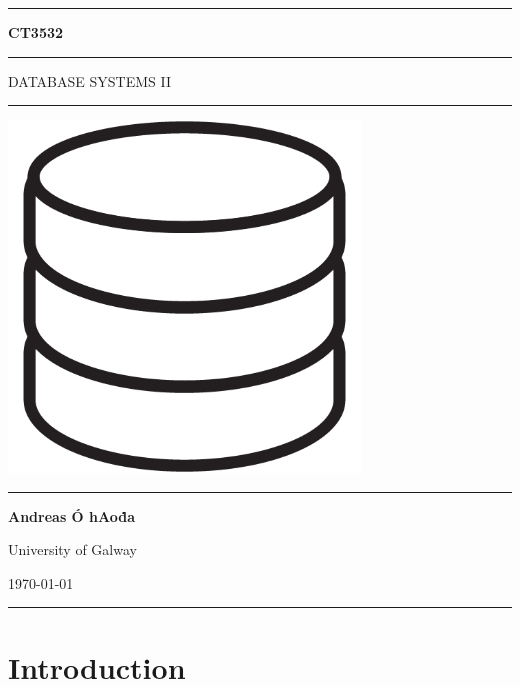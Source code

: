 \documentclass[a4paper,11pt]{article}
\begin{document}
\begin{titlepage}
    \begin{center}
        \hrule
        \vspace*{0.6cm}
        \huge \textbf{CT3532}
        \vspace*{0.6cm}
        \hrule
        \LARGE
       \vspace{0.5cm}
        DATABASE SYSTEMS II
       \vspace{0.5cm}
       \hrule
            
       \vfill
       \includegraphics[width=0.7\textwidth]{images/db.png}
        \vfill

        \Large
       \vspace{0.5cm}
       \hrule
       \vspace{0.5cm}
       \textbf{Andreas Ó hAoḋa}
            
       \normalsize
       University of Galway

       \today

       \vspace{0.5cm}
       \hrule
    \end{center}
\end{titlepage}

\newpage
\tableofcontents
\newpage
\setcounter{page}{1}

\section{Introduction}
\end{document}
